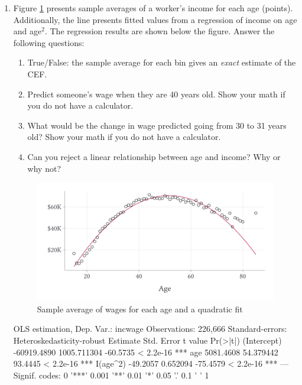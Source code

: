 \documentclass[12pt]{article}
\begin{document}
\begin{enumerate}
  \bigskip
  \item Figure \ref{fig:wage_vs_age} presents sample averages of a worker's income for each age (points).
  Additionally, the line presents fitted values from a regression of income on age and age$^2$.
  The regression results are shown below the figure. Answer the following questions:

  \begin{enumerate}
    \item True/False: the sample average for each bin gives an \emph{exact} estimate of the CEF.
    
    \item Predict someone's wage when they are 40 years old. Show your math if you do not have a calculator.
    
    \item What would be the change in wage predicted going from 30 to 31 years old? Show your math if you do not have a calculator. 
    
    \item Can you reject a linear relationship between age and income? Why or why not?
  \end{enumerate}

  \begin{figure}
    \caption{Sample average of wages for each age and a quadratic fit}
    \label{fig:wage_vs_age}
    \includegraphics[width = \linewidth]{figures/plot_wage_age.pdf}
  \end{figure}

  \vspace*{-2\bigskipamount}
  \begin{codeblock}[{}]
OLS estimation, Dep. Var.: incwage
Observations: 226,666
Standard-errors: Heteroskedasticity-robust 
                Estimate  Std. Error  t value  Pr(>|t|)    
(Intercept) -60919.4890 1005.711304 -60.5735 < 2.2e-16 ***
age           5081.4608   54.379442  93.4445 < 2.2e-16 ***
I(age^2)       -49.2057    0.652094 -75.4579 < 2.2e-16 ***
---
Signif. codes:  0 '***' 0.001 '**' 0.01 '*' 0.05 '.' 0.1 ' ' 1
  \end{codeblock}


\end{enumerate}
\end{document}
